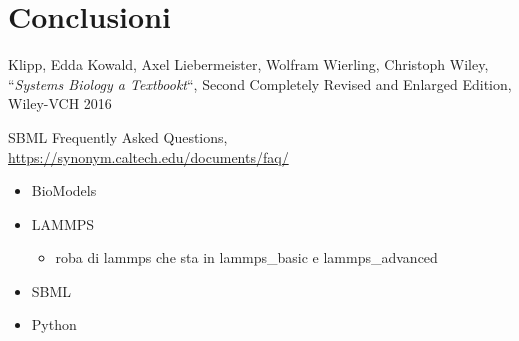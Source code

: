 \documentclass[Lau, oneside]{sapthesis}
\begin{document}
\chapter{Conclusioni}

\backmatter
{}
\begin{thebibliography}{17}

Klipp, Edda Kowald, Axel Liebermeister, Wolfram Wierling, Christoph Wiley,  “\textit{Systems Biology a Textbookt}“, Second Completely Revised and Enlarged Edition, Wiley-VCH 2016 

SBML Frequently Asked Questions, \url{https://synonym.caltech.edu/documents/faq/}

\begin{itemize}
    \item BioModels
    \item LAMMPS
    \begin{itemize}
        \item roba di lammps che sta in lammps\_basic e lammps\_advanced
    \end{itemize}
    \item SBML
    \item Python
\end{itemize}

\end{thebibliography}
\end{document}
